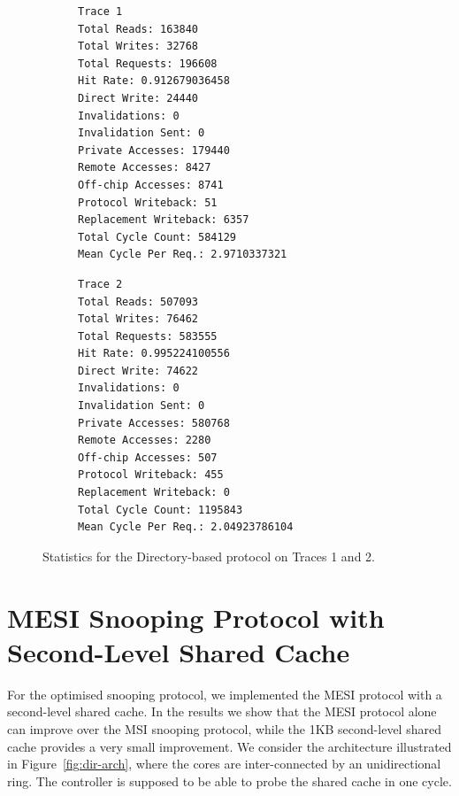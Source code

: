 \documentclass[12pt, a4paper, twoside]{article}
\begin{document}
\begin{figure}[h]
\centering
\begin{subfigure}{0.48\textwidth}
\begin{verbatim}
Trace 1
Total Reads: 163840
Total Writes: 32768
Total Requests: 196608
Hit Rate: 0.912679036458
Direct Write: 24440
Invalidations: 0
Invalidation Sent: 0
Private Accesses: 179440
Remote Accesses: 8427
Off-chip Accesses: 8741
Protocol Writeback: 51
Replacement Writeback: 6357
Total Cycle Count: 584129
Mean Cycle Per Req.: 2.9710337321
\end{verbatim}
\end{subfigure}
\begin{subfigure}{0.48\textwidth}
\begin{verbatim}
Trace 2
Total Reads: 507093
Total Writes: 76462
Total Requests: 583555
Hit Rate: 0.995224100556
Direct Write: 74622
Invalidations: 0
Invalidation Sent: 0
Private Accesses: 580768
Remote Accesses: 2280
Off-chip Accesses: 507
Protocol Writeback: 455
Replacement Writeback: 0
Total Cycle Count: 1195843
Mean Cycle Per Req.: 2.04923786104
\end{verbatim}
\end{subfigure}
\caption{Statistics for the Directory-based protocol on Traces 1 and 2.}
\end{figure}


\section{MESI Snooping Protocol with Second-Level Shared Cache} \label{sec:mesi-snooping-2lvl}

For the optimised snooping protocol, we implemented the MESI protocol
with a second-level shared cache. In the results we show that the MESI protocol
alone can improve over the MSI snooping protocol, while the 1KB second-level
shared cache provides a very small improvement.
We consider the architecture illustrated in Figure~\ref{fig:dir-arch},
where the cores are inter-connected by an unidirectional ring.
The controller is supposed to be able to probe the shared cache in one cycle.
\end{document}
